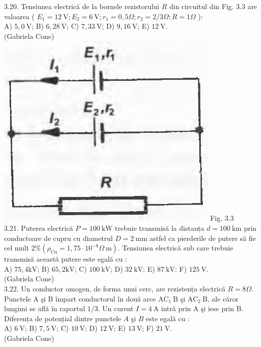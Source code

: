 \documentclass[10pt]{article}
\begin{document}
3.20. Tensiunea electrică de la bornele rezistorului $R$ din circuitul din Fig. 3.3 are valoarea ( $E_{1}=12 \mathrm{~V} ; E_{2}=6 \mathrm{~V} ; r_{1}=0,5 \Omega ; r_{2}=2 / 3 \Omega ; R=1 \Omega$ ):\\ A) $5,0 \mathrm{~V}$; B) $6,28 \mathrm{~V}$; C) $7,33 \mathrm{~V}$; D) $9,16 \mathrm{~V}$; E) $12 \mathrm{~V}$.\\ (Gabriela Cone)\\ \includegraphics[max width=\textwidth, center]{2025_07_01_5b3ff9fa0d508c8e9f17g-147} Fig. 3.3\\

3.21. Puterea electrică $P=100 \mathrm{~kW}$ trebuie transmisă la distanța $d=100 \mathrm{~km}$ prin conductoare de cupru cu diametrul $D=2 \mathrm{~mm}$ astfel ca pierderile de putere să fie cel mult $2 \%\left(\rho_{\mathrm{Cu}}=1,75 \cdot 10^{-8} \Omega \mathrm{~m}\right)$. Tensiunea electrică sub care trebuie transmisă această putere este egală cu :\\ A) $75,4 \mathrm{kV}$; B) $65,2 \mathrm{kV}$; C) $100 \mathrm{~kV}$; D) $32 \mathrm{~kV}$; E) $87 \mathrm{~kV}$; F) $125 \mathrm{~V}$.\\ (Gabriela Cone)\\

3.22. Un conductor omogen, de forma unui cerc, are rezistența electrică $R=8 \Omega$. Punctele A şi B împart conductorul în două arce $\mathrm{AC}_{1} \mathrm{~B}$ şi $\mathrm{AC}_{2} \mathrm{~B}$, ale căror lungimi se află în raportul $1 / 3$. Un curent $I=4 \mathrm{~A}$ intră prin A şi iese prin B. Diferența de potențial dintre punctele $A$ şi $B$ este egală cu :\\ A) $6 \mathrm{~V}$; B) $7,5 \mathrm{~V}$; C) $10 \mathrm{~V}$; D) $12 \mathrm{~V}$; E) $13 \mathrm{~V}$; F) $21 \mathrm{~V}$.\\ (Gabriela Cone)\\
\end{document}
